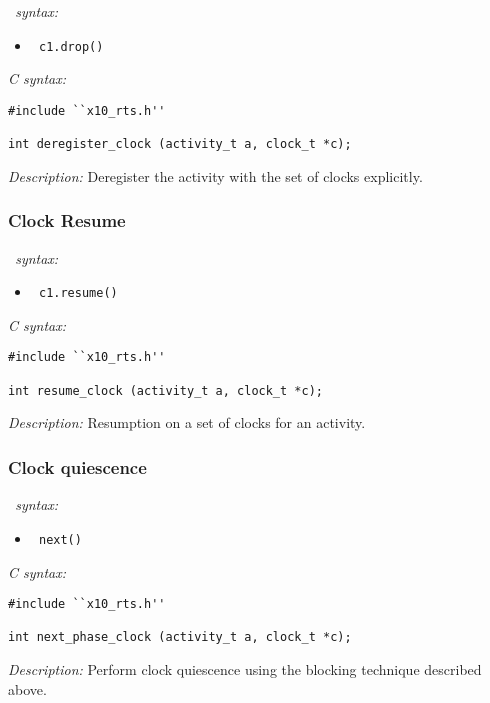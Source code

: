 {\it \Xten\ syntax:}
\\
\begin{itemize}
\item \begin{verbatim} c1.drop() \end{verbatim}
\end{itemize}
{\it C syntax:}
\begin{verbatim}
#include ``x10_rts.h''

int deregister_clock (activity_t a, clock_t *c);
\end{verbatim}

{\it Description:}
Deregister the activity with the set of clocks explicitly. 

\subsubsection{Clock Resume}

{\it \Xten\ syntax:}
\\
\begin{itemize}
\item \begin{verbatim} c1.resume() \end{verbatim}
\end{itemize}
{\it C syntax:}
\begin{verbatim}
#include ``x10_rts.h''

int resume_clock (activity_t a, clock_t *c);
\end{verbatim}

{\it Description:}
Resumption on a set of clocks for an activity.

\subsubsection{Clock quiescence}

{\it \Xten\ syntax:}
\\
\begin{itemize}
\item \begin{verbatim} next() \end{verbatim}
\end{itemize}
{\it C syntax:}
\begin{verbatim}
#include ``x10_rts.h''

int next_phase_clock (activity_t a, clock_t *c);
\end{verbatim}

{\it Description:}
Perform clock quiescence using the blocking technique described above.

